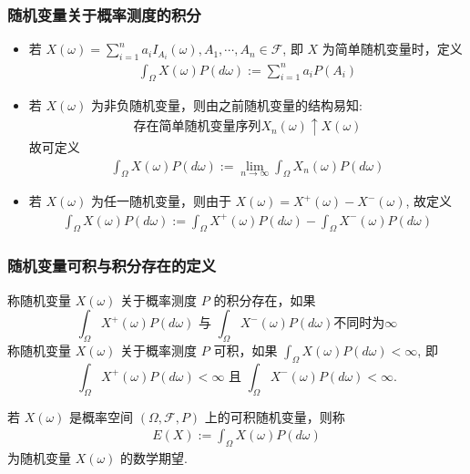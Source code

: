 	\begin{frame}
		\frametitle{随机变量关于概率测度的积分}
		\begin{itemize}[<+-|alert@+>]
			\item 若 $X (\omega)=\sum_{i=1}^{n} a_{i} I_{A_{i}}(\omega), A_1,\cdots, A_n\in\mathcal{F}$, 即 $X$ 为简单随机变量时，定义 \pause
			\begin{eqnarray*}
				\int_\Omega X(\omega)P(d\omega):=\sum_{i=1}^na_iP(A_i)
			\end{eqnarray*}
			\item 若 $X (\omega)$ 为非负随机变量，则由之前随机变量的结构易知:\pause
			\begin{eqnarray*}
				\mbox{存在简单随机变量序列} X_n (\omega)\uparrow X (\omega)
			\end{eqnarray*}
			故可定义 \pause
			\begin{eqnarray*}
				\int_\Omega X(\omega)P(d\omega):=\lim_{n\rightarrow\infty}\int_\Omega X_n(\omega)P(d\omega)
			\end{eqnarray*}
			\item 若 $X (\omega)$ 为任一随机变量，则由于 $X (\omega)=X^+(\omega)-X^-(\omega)$, 故定义 \pause
			\begin{eqnarray*}
				\int_\Omega X(\omega)P(d\omega):=\int_\Omega X^+(\omega)P(d\omega)-\int_\Omega X^-(\omega)P(d\omega)
			\end{eqnarray*}

		\end{itemize}
	\end{frame}
	\begin{frame}
		\frametitle{随机变量可积与积分存在的定义}
		\begin{defi}
			称随机变量 $X (\omega)$ 关于概率测度 $P$ 的积分存在，如果 \pause
			\[\int_\Omega X^+(\omega) P (d\omega) \mbox{ 与 }\int_\Omega X^-(\omega) P (d\omega) \mbox{不同时为}\infty\]                                                  \pause  称随机变量 $X (\omega)$ 关于概率测度 $P$ 可积，如果 \pause $\int_\Omega X (\omega) P (d\omega)<\infty$, 即 \pause
			\[\int_\Omega X^+(\omega) P (d\omega)<\infty \mbox{ 且 }\int_\Omega X^-(\omega) P (d\omega)<\infty.\]                                                         \end{defi}
		\pause
		\begin{defi}
			若 $X (\omega)$ 是概率空间 $(\Omega,\mathcal{F},P)$ 上的可积随机变量，则称
			\begin{eqnarray*}
				E(X):=\int_\Omega X(\omega)P(d\omega)
			\end{eqnarray*}
			为随机变量 $X (\omega)$ 的数学期望.
		\end{defi}
	\end{frame}

